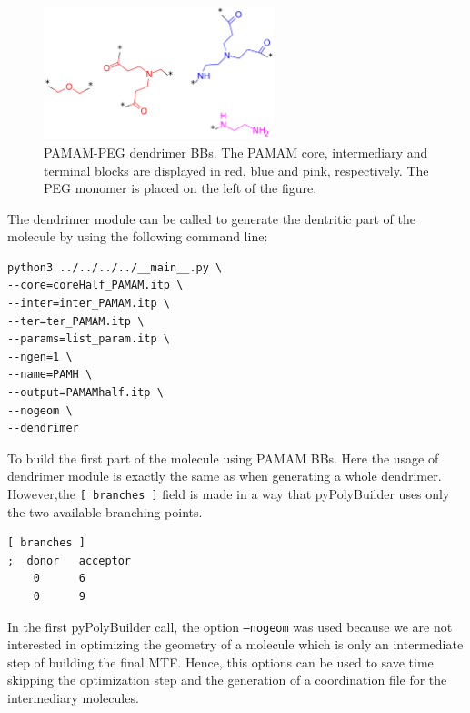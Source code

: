 \begin{figure}
    \centering
    \includegraphics[width=0.6\textwidth]{PAMAM_PEG/PAMAMPEGBBs.png}
    \caption{PAMAM-PEG dendrimer BBs. The PAMAM core, intermediary and terminal blocks are displayed in red, blue and pink, respectively. The PEG monomer is placed on the left of the figure.}
    \label{fig:PAMAMPEGBBs}
\end{figure}

The dendrimer module can be called to generate the dentritic part of the molecule by using the following command line:

\begin{lstlisting}
python3 ../../../../__main__.py \
--core=coreHalf_PAMAM.itp \
--inter=inter_PAMAM.itp \
--ter=ter_PAMAM.itp \
--params=list_param.itp \
--ngen=1 \
--name=PAMH \
--output=PAMAMhalf.itp \
--nogeom \
--dendrimer
\end{lstlisting}

To build the first part of the molecule using PAMAM BBs.
Here the usage of dendrimer module is exactly the same as when generating a whole dendrimer.
However,the \texttt{[ branches ]} field is made in a way that pyPolyBuilder uses only the two available branching points.

\begin{lstlisting}
[ branches ]
;  donor   acceptor
    0      6
    0      9
\end{lstlisting}

In the first pyPolyBuilder call, the option \texttt{--nogeom} was used because we are not interested in optimizing the geometry of a molecule which is only an intermediate step of building the final MTF.
Hence, this options can be used to save time skipping the optimization step and the generation of a coordination file for the intermediary molecules.

